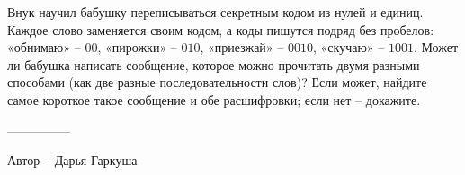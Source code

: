 \question
Внук научил бабушку переписываться секретным кодом из нулей и единиц. Каждое слово заменяется своим кодом, а коды пишутся подряд без пробелов: «обнимаю» -- $00$, «пирожки» -- $010$, «приезжай» -- $0010$, «скучаю» -- $1001$. Может ли бабушка написать сообщение, которое можно прочитать двумя разными способами (как две разные последовательности слов)? Если может, найдите самое короткое такое сообщение и обе расшифровки; если нет -- докажите.

---------------

Автор -- Дарья Гаркуша